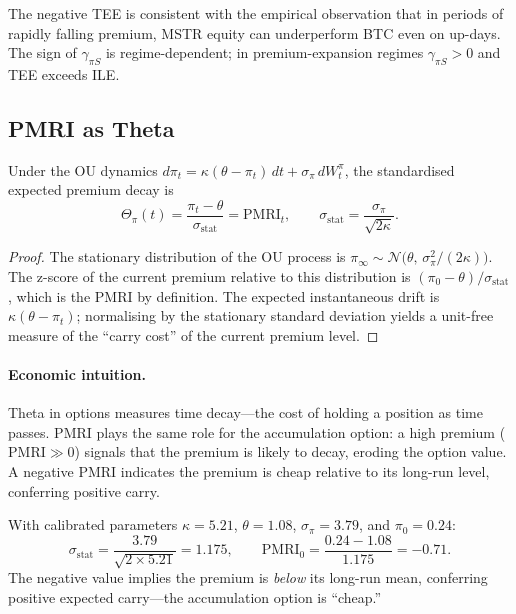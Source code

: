\begin{remark}
The negative TEE is consistent with the empirical observation that in periods of
rapidly falling premium, MSTR equity can underperform BTC even on up-days.
The sign of $\gamma_{\pi S}$ is regime-dependent; in premium-expansion regimes
$\gamma_{\pi S} > 0$ and TEE exceeds ILE.
\end{remark}

\subsection{PMRI as Theta}\label{ssec:pmri-theta}

\begin{proposition}\label{prop:pmri-theta}
Under the OU dynamics $d\pi_t = \kappa(\theta - \pi_t)\,dt + \sigma_\pi\,dW_t^{\pi}$,
the standardised expected premium decay is
$$
  \Theta_{\pi}(t)
  = \frac{\pi_t - \theta}{\sigma_{\mathrm{stat}}}
  = \mathrm{PMRI}_t,
  \qquad
  \sigma_{\mathrm{stat}} = \frac{\sigma_\pi}{\sqrt{2\kappa}}.
$$
\end{proposition}

\begin{proof}
The stationary distribution of the OU process is $\pi_\infty \sim
\mathcal{N}\!\bigl(\theta,\,\sigma_\pi^2/(2\kappa)\bigr)$.
The z-score of the current premium relative to this distribution is
$(\pi_0 - \theta)/\sigma_{\mathrm{stat}}$, which is the PMRI by definition.
The expected instantaneous drift is $\kappa(\theta - \pi_t)$; normalising by
the stationary standard deviation yields a unit-free measure of the ``carry
cost'' of the current premium level.
\end{proof}

\paragraph{Economic intuition.}
Theta in options measures time decay---the cost of holding a position as time
passes.  PMRI plays the same role for the accumulation option: a high
premium ($\mathrm{PMRI} \gg 0$) signals that the premium is likely to decay,
eroding the option value.  A negative PMRI indicates the premium is cheap
relative to its long-run level, conferring positive carry.

With calibrated parameters $\kappa = 5.21$, $\theta = 1.08$,
$\sigma_\pi = 3.79$, and $\pi_0 = 0.24$:
$$
  \sigma_{\mathrm{stat}} = \frac{3.79}{\sqrt{2 \times 5.21}} = 1.175,
  \qquad
  \mathrm{PMRI}_0 = \frac{0.24 - 1.08}{1.175} = -0.71.
$$
The negative value implies the premium is \emph{below} its long-run mean,
conferring positive expected carry---the accumulation option is ``cheap.''

